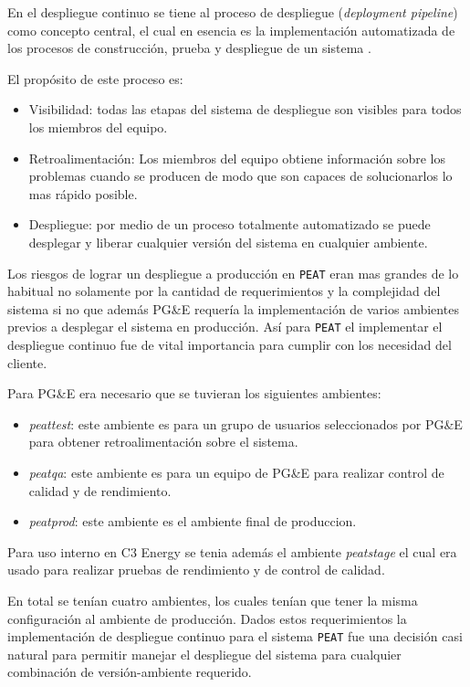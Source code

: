 En el despliegue continuo se tiene al proceso de despliegue (\textit{deployment
  pipeline}) como concepto central, el cual en esencia es la implementación
automatizada de los procesos de construcción, prueba y despliegue de un
sistema \cite{28_humble_farley_2011}.

El propósito de este proceso es:
\begin{itemize}
\item Visibilidad: todas las etapas del sistema de despliegue son visibles
  para todos los miembros del equipo.
\item Retroalimentación: Los miembros del equipo obtiene información sobre los
  problemas cuando se producen de modo que son capaces de solucionarlos lo mas
  rápido posible.
\item Despliegue: por medio de un proceso totalmente automatizado se puede
  desplegar y liberar cualquier versión del sistema en cualquier ambiente.
\end{itemize}

Los riesgos de lograr un despliegue a producción en \texttt{PEAT} eran mas grandes
de lo habitual no solamente por la cantidad de requerimientos y la complejidad
del sistema si no que además PG\&E requería la implementación de varios ambientes
previos a desplegar el sistema en producción. Así para \texttt{PEAT} el implementar
el despliegue continuo fue de vital importancia para cumplir con los necesidad
del cliente.

Para PG\&E era necesario que se tuvieran los siguientes ambientes:
\begin{itemize}
\item \textit{peattest}: este ambiente es para un grupo de usuarios seleccionados
  por PG\&E para obtener retroalimentación sobre el sistema.
\item \textit{peatqa}: este ambiente es para un equipo de PG\&E para realizar
  control de calidad y de rendimiento.
\item \textit{peatprod}: este ambiente es el ambiente final de produccion.
\end{itemize}

Para uso interno en C3 Energy se tenia además el ambiente \textit{peatstage}
el cual era usado para realizar pruebas de rendimiento y de control de calidad.

En total se tenían cuatro ambientes, los cuales tenían que tener la misma
configuración al ambiente de producción. Dados estos requerimientos la implementación
de despliegue continuo para el sistema \texttt{PEAT} fue una decisión
casi natural para permitir manejar el despliegue del sistema para cualquier
combinación de versión-ambiente requerido.


